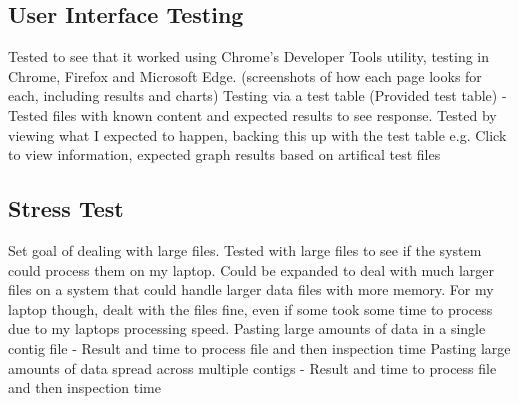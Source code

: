 \subsection{User Interface Testing}
Tested to see that it worked using Chrome's Developer Tools utility, testing in Chrome, Firefox and Microsoft Edge. (screenshots of how each page looks for each, including results and charts)
Testing via a test table (Provided test table) - Tested files with known content and expected results to see response. Tested by viewing what I expected to happen, backing this up with the test table e.g. Click to view information, expected graph results based on artifical test files

\subsection{Stress Test}
Set goal of dealing with large files. Tested with large files to see if the system could process them on my laptop. Could be expanded to deal with much larger files on a system that could handle larger data files with more memory. For my laptop though, dealt with the files fine, even if some took some time to process due to my laptops processing speed.
Pasting large amounts of data in a single contig file - Result and time to process file and then inspection time
Pasting large amounts of data spread across multiple contigs - Result and time to process file and then inspection time
